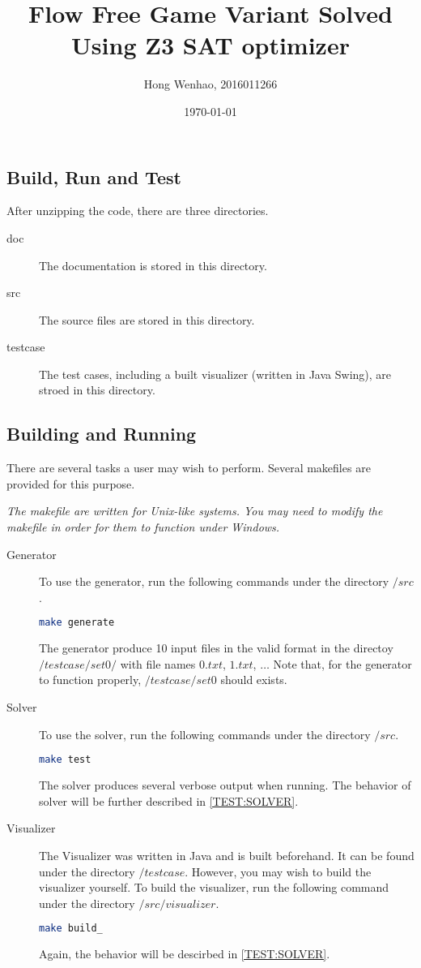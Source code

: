 \documentclass{article}
\title{\textmd{\bf Flow Free Game Variant Solved Using Z3 SAT optimizer}}
\date{\today}
\author{Hong Wenhao, 2016011266}
\begin{document}
\begin{spacing}{1.1}
    \maketitle
    \newpage
    \tableofcontents
    \newpage
    \setcounter{section}{-1}

    \section{Build, Run and Test}
    After unzipping the code, there are three directories.
    \begin{description}
        \item [doc] The documentation is stored in this directory.
        \item [src] The source files are stored in this directory.
        \item [testcase] The test cases, including a built visualizer (written in Java Swing), are stroed in this directory.
    \end{description}

    \subsection{Building and Running}
    \label{BUILD}
    There are several tasks a user may wish to perform. Several makefiles are provided for this purpose.

    \emph{The makefile are written for Unix-like systems. You may need to modify the makefile in order for them to function under Windows.}
    \begin{description}
        \item [Generator] To use the generator, run the following commands under the directory $/src$.
        \begin{lstlisting}[language = bash]
make generate\end{lstlisting}
        The generator produce 10 input files in the valid format in the directoy $/testcase/set0/$ with file names $0.txt$, $1.txt$, $\ldots$ Note that, for the generator to function properly, $/testcase/set0$ should exists.
        \item [Solver] To use the solver, run the following commands under the directory $/src$.
        \begin{lstlisting}[language = bash]
make test\end{lstlisting}
        The solver produces several verbose output when running. The behavior of solver will be further described in \ref{TEST:SOLVER}.
        \item [Visualizer] The Visualizer was written in Java and is built beforehand. It can be found under the directory
        $/testcase$. However, you may wish to build the visualizer yourself. To build the visualizer, run the following command under
        the directory $/src/visualizer$.
        \begin{lstlisting}[language = bash]
make build_\end{lstlisting}
        Again, the behavior will be descirbed in \ref{TEST:SOLVER}.
    \end{description}


\end{spacing}
\end{document}
